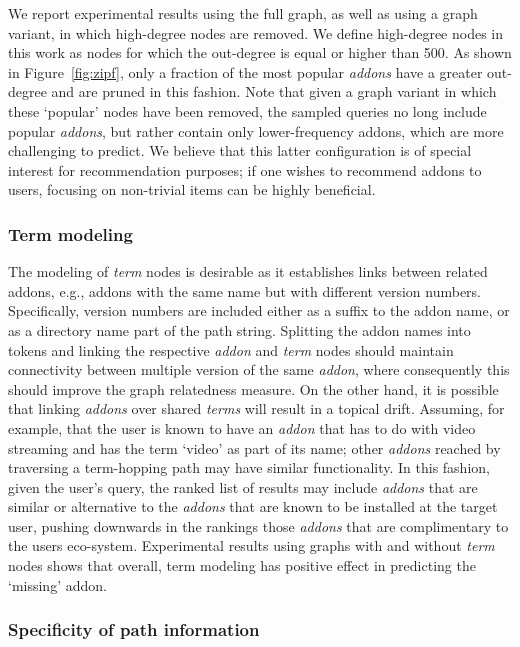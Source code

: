 \documentclass[11pt,oneside]{book}
\let\Oldsubsubsection\subsubsection
\renewcommand{\subsubsection}{\FloatBarrier\Oldsubsubsection}
\begin{document}
We report experimental results using the full graph, as well as using a graph variant, in which high-degree nodes are removed. We define high-degree nodes in this work as nodes for which the out-degree is equal or higher than 500. As shown in Figure~\ref{fig:zipf}, only a fraction of the most popular {\it addons} have a greater out-degree and are pruned in this fashion. Note that given a graph variant in which these `popular' nodes have been removed, the sampled queries no long include popular {\it addons}, but rather contain only lower-frequency addons, which are more challenging to predict. We believe that this latter configuration is of special interest for recommendation purposes; if one wishes to recommend addons to users, focusing on non-trivial items can be highly beneficial.

\subsubsection{Term modeling}

The modeling of {\it term} nodes is desirable as it establishes links between related addons, e.g., addons with the same name but with different version numbers. Specifically, version numbers are included either as a suffix to the addon name, or as a directory name part of the path string. Splitting the addon names into tokens and linking the respective {\it addon} and {\it term} nodes should maintain connectivity between multiple version of the same {\it addon}, where consequently this should improve the graph relatedness measure. On the other hand, it is possible that linking {\it addons} over shared {\it terms} will result in a topical drift. Assuming, for example, that the user is known to have an {\it addon} that has to do with video streaming and has the term `video' as part of its name; other {\it addons} reached by traversing a term-hopping path may have similar functionality. In this fashion, given the user's query, the ranked list of results may include {\it addons} that are similar or alternative to the {\it addons} that are known to be installed at the target user, pushing downwards in the rankings those {\it addons} that are complimentary to the users eco-system. Experimental results using graphs with and without {\it term} nodes shows that overall, term modeling has positive effect in predicting the `missing' addon.

\subsubsection{Specificity of path information} 
\end{document}

